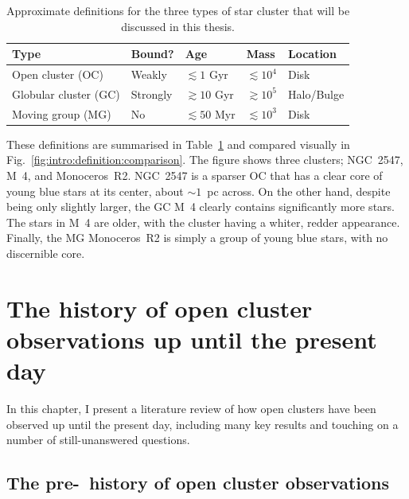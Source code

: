 \begin{table}[tb]
	\begin{tabularx}{\textwidth}{l | X | X | X | X}
		\hline\hline
		Type & Bound? & Age & Mass & Location \\
		\hline
		Open cluster (OC)   & Weakly & $\lesssim 1$ Gyr & $\lesssim 10^4$ \MSun & Disk \\
		Globular cluster (GC)   & Strongly & $\gtrsim 10$ Gyr & $\gtrsim 10^5$ \MSun & Halo/Bulge \\
		Moving group (MG)   & No & $\lesssim 50$ Myr & $\lesssim 10^3$ \MSun & Disk\\
		\hline
	\end{tabularx}
	\caption{Approximate definitions for the three types of star cluster that will be discussed in this thesis.\label{tab:intro:definition:definition}}
\end{table}

These definitions are summarised in Table~\ref{tab:intro:definition:definition} and compared visually in Fig.~\ref{fig:intro:definition:comparison}. The figure shows three clusters; NGC~2547, M~4, and Monoceros~R2. NGC~2547 is a sparser OC that has a clear core of young blue stars at its center, about $\sim 1$~pc across. On the other hand, despite being only slightly larger, the GC M~4 clearly contains significantly more stars. The stars in M~4 are older, with the cluster having a whiter, redder appearance. Finally, the MG Monoceros~R2 is simply a group of young blue stars, with no discernible core. 





\section{The history of open cluster observations up until the present day}
\label{sec:intro:history}

In this chapter, I present a literature review of how open clusters have been observed up until the present day, including many key results and touching on a number of still-unanswered questions.

\subsection{The pre-\gaia\ history of open cluster observations}
\label{sec:intro:history:history}

